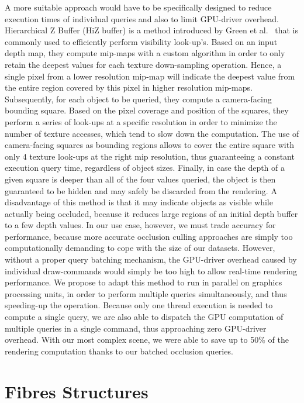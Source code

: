 A more suitable approach would have to be specifically designed to reduce execution times of individual queries and also to limit GPU-driver overhead.
Hierarchical Z Buffer (HiZ buffer) is a method introduced by Green et al.~\cite{greene1993hierarchical} that is commonly used to efficiently perform visibility look-up's.
Based on an input depth map, they compute mip-maps with a custom algorithm in order to only retain the deepest values for each texture down-sampling operation.
Hence, a single pixel from a lower resolution mip-map will indicate the deepest value from the entire region covered by this pixel in higher resolution mip-maps.
Subsequently, for each object to be queried, they compute a camera-facing bounding square.
Based on the pixel coverage and position of the squares, they perform a series of look-ups at a specific resolution in order to minimize the number of texture accesses, which tend to slow down the computation.
The use of camera-facing squares as bounding regions allows to cover the entire square with only 4 texture look-ups at the right mip resolution, thus guaranteeing a constant execution query time, regardless of object sizes.
Finally, in case the depth of a given square is deeper than all of the four values queried, the object is then guaranteed to be hidden and may safely be discarded from the rendering.
A disadvantage of this method is that it may indicate objects as visible while actually being occluded, because it reduces large regions of an initial depth buffer to a few depth values.
In our use case, however, we must trade accuracy for performance, because more accurate occlusion culling approaches are simply too computationally demanding to cope with the size of our datasets.
However, without a proper query batching mechanism, the GPU-driver overhead caused by individual draw-commands would simply be too high to allow real-time rendering performance.
We propose to adapt this method to run in parallel on graphics processing units, in order to perform multiple queries simultaneously, and thus speeding-up the operation.
Because only one thread execution is needed to compute a single query, we are also able to dispatch the GPU computation of multiple queries in a single command, thus approaching zero GPU-driver overhead.
With our most complex scene, we were able to save up to 50\% of the rendering computation thanks to our batched occlusion queries.

\section{Fibres Structures}

